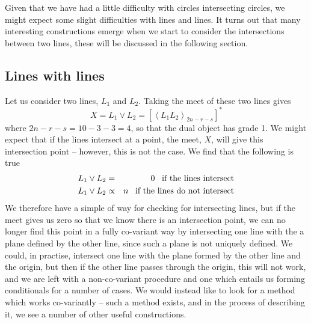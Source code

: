 Given that we have had a little difficulty with circles
intersecting circles, we might expect some slight
difficulties with lines and lines. It turns out that many
interesting constructions emerge when we start to
consider the intersections between two lines, these will
be discussed in the following section.


\subsection{Lines with lines }

Let us consider two lines, $L_1$ and $L_2$. Taking the
meet of these two lines gives
%
\begin{equation}
X = L_1 \vee L_2 = \left[\left< L_1 L_2
\right>_{2n-r-s}\right]^*
\end{equation}
%
where $2n-r-s=10-3-3=4$, so that the dual object has
grade 1. We might expect that if the lines intersect at a
point, the meet, $X$, will give this intersection point
-- however, this is not the case. We find that the
following is true
%
\begin{eqnarray}
L_1 \vee L_2 & = & 0 \;\;\; \mbox{if the lines intersect}
\nonumber \\
L_1 \vee L_2 & \propto & n \;\;\; \mbox{if the lines do
not intersect}
\end{eqnarray}
%
We therefore have a simple of way for checking for
intersecting lines, but if the meet gives us zero so that
we know there is an intersection point, we can no longer
find this point in a fully co-variant way by intersecting
one line with the a plane defined by the other line,
since such a plane is not uniquely defined. We could, in
practise, intersect one line with the plane formed by the
other line and the origin, but then if the other line
passes through the origin, this will not work, and we are
left with a non-co-variant procedure and one which entails
us forming conditionals for a number of cases. We would
instead like to look for a method which works co-variantly
-- such a method exists, and in the process of describing
it, we see a number of other useful constructions.

